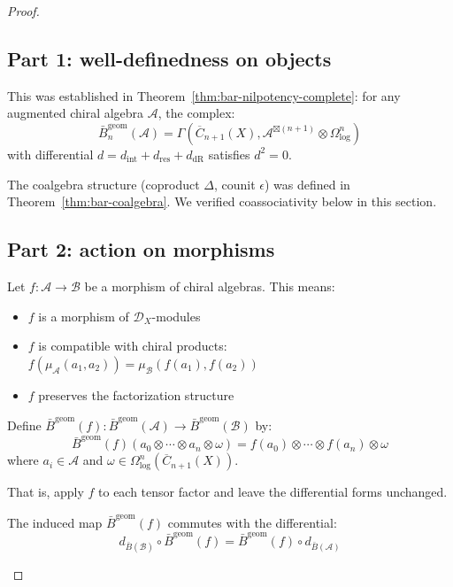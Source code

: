 \begin{proof}

\subsection*{Part 1: well-definedness on objects}

This was established in Theorem~\ref{thm:bar-nilpotency-complete}: for any augmented chiral algebra $\mathcal{A}$, the complex:
\[\bar{B}^{\text{geom}}_n(\mathcal{A}) = \Gamma(\overline{C}_{n+1}(X), \mathcal{A}^{\boxtimes(n+1)} \otimes \Omega^n_{\log})\]
with differential $d = d_{\text{int}} + d_{\text{res}} + d_{\text{dR}}$ satisfies $d^2 = 0$.

The coalgebra structure (coproduct $\Delta$, counit $\epsilon$) was defined in Theorem~\ref{thm:bar-coalgebra}. We verified coassociativity below in this section.

\subsection*{Part 2: action on morphisms}

Let $f: \mathcal{A} \to \mathcal{B}$ be a morphism of chiral algebras. This means:
\begin{itemize}
\item $f$ is a morphism of $\mathcal{D}_X$-modules
\item $f$ is compatible with chiral products: $f(\mu_\mathcal{A}(a_1, a_2)) = \mu_\mathcal{B}(f(a_1), f(a_2))$
\item $f$ preserves the factorization structure
\end{itemize}

\begin{definition}\label{def:bar-induced-map}
Define $\bar{B}^{\text{geom}}(f): \bar{B}^{\text{geom}}(\mathcal{A}) \to \bar{B}^{\text{geom}}(\mathcal{B})$ by:
\[\bar{B}^{\text{geom}}(f)(a_0 \otimes \cdots \otimes a_n \otimes \omega) = f(a_0) \otimes \cdots \otimes f(a_n) \otimes \omega\]
where $a_i \in \mathcal{A}$ and $\omega \in \Omega^n_{\log}(\overline{C}_{n+1}(X))$.

That is, apply $f$ to each tensor factor and leave the differential forms unchanged.
\end{definition}

\begin{lemma}\label{lem:bar-induced-chain-map}
The induced map $\bar{B}^{\text{geom}}(f)$ commutes with the differential:
\[d_{\bar{B}(\mathcal{B})} \circ \bar{B}^{\text{geom}}(f) = \bar{B}^{\text{geom}}(f) \circ d_{\bar{B}(\mathcal{A})}\]
\end{lemma}


\end{proof}
